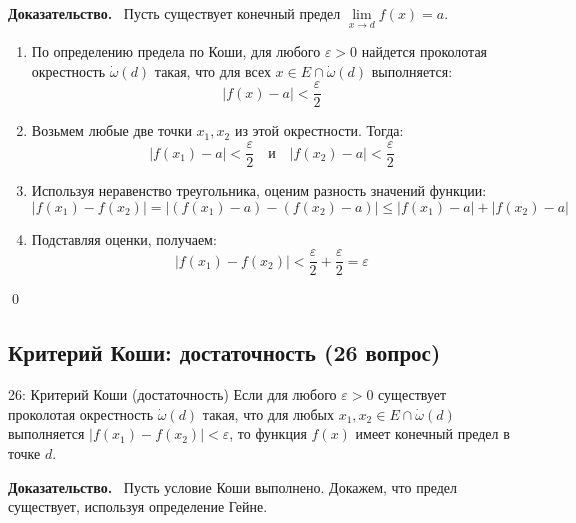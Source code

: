 \documentclass[a4paper,12pt]{article}
\newcommand{\myproof}{\textbf{Доказательство.}\ }
\begin{document}
	\vspace{0.5cm}
	\myproof
	Пусть существует конечный предел $\lim\limits_{x \to d} f(x) = a$.
	\begin{enumerate}
		\item По определению предела по Коши, для любого $\varepsilon > 0$ найдется проколотая окрестность $\dot{\omega}(d)$ такая, что для всех $x \in E \cap \dot{\omega}(d)$ выполняется:
		\[ |f(x) - a| < \frac{\varepsilon}{2} \]
		\item Возьмем любые две точки $x_1, x_2$ из этой окрестности. Тогда:
		\[ |f(x_1) - a| < \frac{\varepsilon}{2} \quad \text{и} \quad |f(x_2) - a| < \frac{\varepsilon}{2} \]
		\item Используя неравенство треугольника, оценим разность значений функции:
		\[ |f(x_1) - f(x_2)| = |(f(x_1) - a) - (f(x_2) - a)| \le |f(x_1) - a| + |f(x_2) - a| \]
		\item Подставляя оценки, получаем:
		\[ |f(x_1) - f(x_2)| < \frac{\varepsilon}{2} + \frac{\varepsilon}{2} = \varepsilon \]
	\end{enumerate} \qed
	
	
	
	
	
	
	
	
	
	
	\newpage
	\subsection{Критерий Коши: достаточность (26 вопрос)}
	
	\begin{theorembox}{26: Критерий Коши (достаточность)}
		Если для любого $\varepsilon > 0$ существует проколотая окрестность $\dot{\omega}(d)$ такая, что для любых $x_1, x_2 \in E \cap \dot{\omega}(d)$ выполняется $|f(x_1) - f(x_2)| < \varepsilon$, то функция $f(x)$ имеет конечный предел в точке $d$.
	\end{theorembox}
	
	\myproof
	Пусть условие Коши выполнено. Докажем, что предел существует, используя определение Гейне.
	
\end{document}
